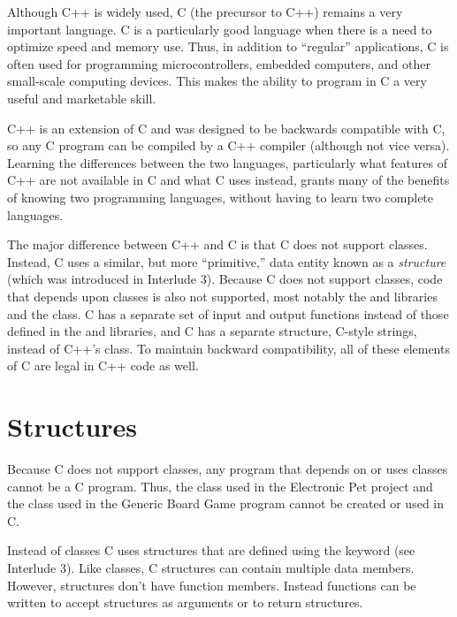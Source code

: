 \addtocounter{chapter}{-1}
Although C++ is widely used, C (the precursor to C++) remains a very important language.  C is a particularly good language when there is a need to optimize speed and memory use.  Thus, in addition to ``regular'' applications, C is often used for programming microcontrollers, embedded computers, and other small-scale computing devices.  This makes the ability to program in C  a very useful and marketable skill.  

 C++ is an extension of C and was designed to be backwards compatible with C, so any C program can be compiled by a C++ compiler (although not vice versa).  Learning the differences between the two languages, particularly what features of C++ are not available in C and what C uses instead, grants many of the benefits of knowing two programming languages, without having to learn two complete languages.

The major difference between C++ and C is that C does not support classes.  Instead, C uses a similar, but more ``primitive,'' data entity known as a \emph{structure} (which was introduced in Interlude 3).  Because C does not support classes, code that depends upon classes is also not supported, most notably the  and  libraries and the  class.  C has a separate set of input and output functions instead of those defined in the  and  libraries, and C has a separate structure, C-style strings, instead of C++'s  class.  To maintain backward compatibility, all of these elements of C are legal in C++ code as well.

\section{Structures}

Because C does not support classes, any program that depends on or uses classes cannot be a C program.   Thus, the  class used in the Electronic Pet project and the   class used in the Generic Board Game program cannot be created or used in C.  

Instead of classes C uses structures that are defined using the keyword  (see Interlude 3).  Like classes, C structures can contain multiple data members.  However, structures don't have function members.  Instead functions can be written to accept structures as arguments or to return structures.  


